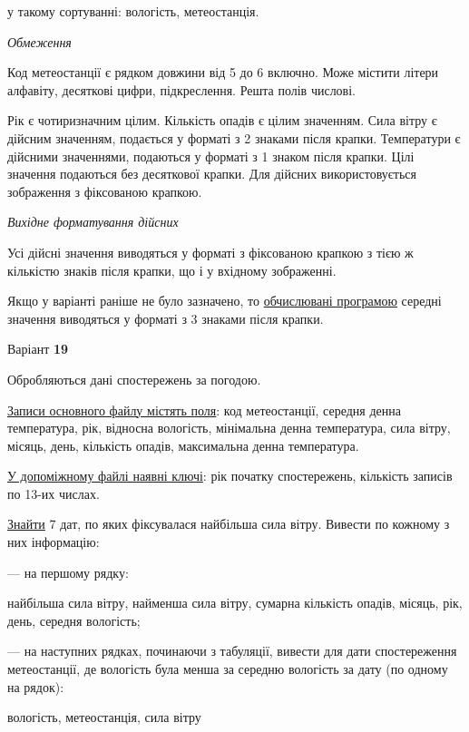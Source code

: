 \documentclass[11pt, ukrainian]{article}
\begin{document}
{\noindent}у такому сортуванні: вологість, метеостанція.


\bigskip\textit{Обмеження}

Код метеостанції є рядком довжини від 5 до 6 включно.
Може містити літери алфавіту, десяткові цифри, підкреслення. Решта полів числові.

Рік є чотиризначним цілим.
Кількість опадів є цілим значенням.
Сила вітру є дійсним значенням, подається у форматі з 2 знаками після крапки.
Температури є дійсними значеннями, подаються у форматі з 1 знаком після крапки.
Цілі значення подаються без десяткової крапки.
Для дійсних використовується зображення з фіксованою крапкою.

\textit{Вихідне форматування дійсних}

Усі дійсні значення виводяться у форматі з фіксованою крапкою з тією ж кількістю знаків після крапки, що і у вхідному зображенні.

Якщо у варіанті раніше не було зазначено, то \underline{обчислювані програмою} середні значення виводяться у форматі з 3 знаками після крапки.


\par
\newpage
{\center Варіант  \No \textbf { 19 }\par}
\bigskip
Обробляються дані спостережень за погодою. 

\underline{Записи основного файлу містять поля}: код метеостанції, середня денна температура, рік, відносна вологість, мінімальна денна температура, сила вітру, місяць, день, кількість опадів, максимальна денна температура.

\underline{У допоміжному файлі наявні ключі}: рік початку спостережень, кількість записів по 13-их числах.

\underline{Знайти} 7 дат, по яких фіксувалася найбільша сила вітру. Вивести по кожному з них інформацію:\par
{\noindent}--- на першому рядку:\par
найбільша сила вітру, найменша сила вітру, сумарна кількість опадів, місяць, рік, день, середня вологість;

{\noindent}--- на наступних рядках, починаючи з табуляції, вивести для дати спостереження метеостанції, де вологість була менша за середню вологість за дату (по одному на рядок):\par
вологість, метеостанція, сила вітру
\end{document}

